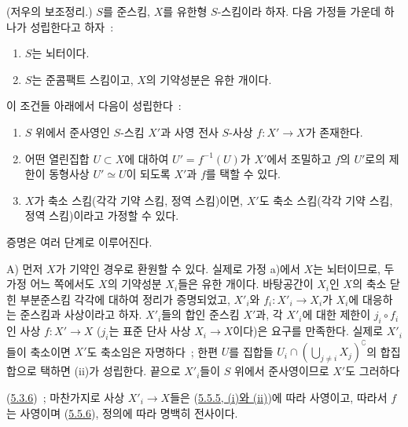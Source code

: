 \begin{theorem}[5.6.1]
\label{II.5.6.1-ko}
(저우의 보조정리.) $S$를 준스킴, $X$를 유한형 $S$-스킴이라 하자.
다음 가정들 가운데 하나가 성립한다고 하자~:
\begin{enumerate}
  \item[\rm{a)}] $S$는 뇌터이다.
  \item[\rm{b)}] $S$는 준콤팩트 스킴이고, $X$의 기약성분은 유한 개이다.
\end{enumerate}
이 조건들 아래에서 다음이 성립한다~:
\begin{enumerate}
  \item[\rm{(i)}] $S$ 위에서 준사영인 $S$-스킴 $X'$과 사영 전사
  $S$-사상 $f:X'\to X$가 존재한다.
  \item[\rm{(ii)}] 어떤 열린집합 $U\subset X$에 대하여
  $U'=f^{-1}(U)$가 $X'$에서 조밀하고 $f$의 $U'$로의 제한이 동형사상
  $U'\simeq U$이 되도록 $X'$과 $f$를 택할 수 있다.
  \item[\rm{(iii)}] $X$가 축소 스킴(각각 기약 스킴, 정역 스킴)이면,
  $X'$도 축소 스킴(각각 기약 스킴, 정역 스킴)이라고 가정할 수 있다.
\end{enumerate}
\end{theorem}

증명은 여러 단계로 이루어진다.

A) 먼저 $X$가 기약인 경우로 환원할 수 있다. 실제로 가정 a)에서
$X$는 뇌터이므로, 두 가정 어느 쪽에서도 $X$의 기약성분 $X_i$들은
유한 개이다. 바탕공간이 $X_i$인 $X$의 축소 닫힌 부분준스킴 각각에
대하여 정리가 증명되었고, $X'_i$와 $f_i:X'_i\to X_i$가 $X_i$에
대응하는 준스킴과 사상이라고 하자. $X'_i$들의 합인 준스킴 $X'$과,
각 $X'_i$에 대한 제한이 $j_i\circ f_i$인 사상 $f:X'\to X$
($j_i$는 표준 단사 사상 $X_i\to X$이다)은 요구를 만족한다. 실제로
$X'_i$들이 축소이면 $X'$도 축소임은 자명하다~; 한편 $U$를 집합들
$U_i\cap(\bigcup_{j\neq i}X_j)^{\complement}$의 합집합으로 택하면 (ii)가
성립한다. 끝으로 $X'_i$들이 $S$ 위에서 준사영이므로 $X'$도 그러하다


(\hyperref[II.5.3.6-ko]{5.3.6})~; 마찬가지로 사상 $X'_i\to X$들은
(\hyperref[II.5.5.5-ko]{5.5.5, (i)와 (ii)})에 따라 사영이고, 따라서
$f$는 사영이며 (\hyperref[II.5.5.6-ko]{5.5.6}), 정의에 따라 명백히
전사이다.

